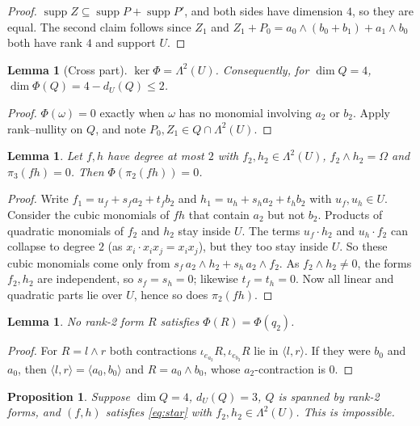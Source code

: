 \documentclass[11pt,a4paper]{article}
\theoremstyle{plain}
\newtheorem{lemma}[theorem]{Lemma}
\newtheorem{proposition}[theorem]{Proposition}
\theoremstyle{definition}
\theoremstyle{remark}
\newcommand{\supp}{\operatorname{supp}}
\newcommand{\Lam}{\Lambda^{2}}
\newcommand{\dU}{d_U}
\begin{document}
\begin{proof}
$\supp Z\subseteq\supp P+\supp P'$, and both sides have dimension $4$, so they are equal. The second claim follows since $Z_1$ and $Z_1+P_0=a_0\wedge(b_0+b_1)+a_1\wedge b_0$ both have rank $4$ and support $U$.
\end{proof}

\begin{lemma}[Cross part]\label{lem:cross}
$\ker\Phi=\Lam(U)$. Consequently, for $\dim Q=4$, $\dim\Phi(Q)=4-\dU(Q)\le 2$.
\end{lemma}

\begin{proof}
$\Phi(\omega)=0$ exactly when $\omega$ has no monomial involving $a_2$ or $b_2$. Apply rank--nullity on $Q$, and note $P_0,Z_1\in Q\cap\Lam(U)$.
\end{proof}

\begin{lemma}\label{lem:planeU}
Let $f,h$ have degree at most $2$ with $f_2,h_2\in\Lam(U)$, $f_2\wedge h_2=\Omega$ and $\pi_3(fh)=0$. Then $\Phi(\pi_2(fh))=0$.
\end{lemma}

\begin{proof}
Write $f_1=u_f+s_fa_2+t_fb_2$ and $h_1=u_h+s_ha_2+t_hb_2$ with $u_f,u_h\in U$. Consider the cubic monomials of $fh$ that contain $a_2$ but not $b_2$. Products of quadratic monomials of $f_2$ and $h_2$ stay inside $U$. The terms $u_f\cdot h_2$ and $u_h\cdot f_2$ can collapse to degree $2$ (as $x_i\cdot x_ix_j=x_ix_j$), but they too stay inside $U$. So these cubic monomials come only from $s_f\,a_2\wedge h_2+s_h\,a_2\wedge f_2$. As $f_2\wedge h_2\ne0$, the forms $f_2,h_2$ are independent, so $s_f=s_h=0$; likewise $t_f=t_h=0$. Now all linear and quadratic parts lie over $U$, hence so does $\pi_2(fh)$.
\end{proof}

\begin{lemma}\label{lem:noq2}
No rank-2 form $R$ satisfies $\Phi(R)=\Phi(q_2)$.
\end{lemma}

\begin{proof}
For $R=l\wedge r$ both contractions $\iota_{e_{a_2}}R,\iota_{e_{b_2}}R$ lie in $\langle l,r\rangle$. If they were $b_0$ and $a_0$, then $\langle l,r\rangle=\langle a_0,b_0\rangle$ and $R=a_0\wedge b_0$, whose $a_2$-contraction is $0$.
\end{proof}

\begin{proposition}\label{prop:B}
Suppose $\dim Q=4$, $\dU(Q)=3$, $Q$ is spanned by rank-2 forms, and $(f,h)$ satisfies \eqref{eq:star} with $f_2,h_2\in\Lam(U)$. This is impossible.
\end{proposition}
\end{document}
